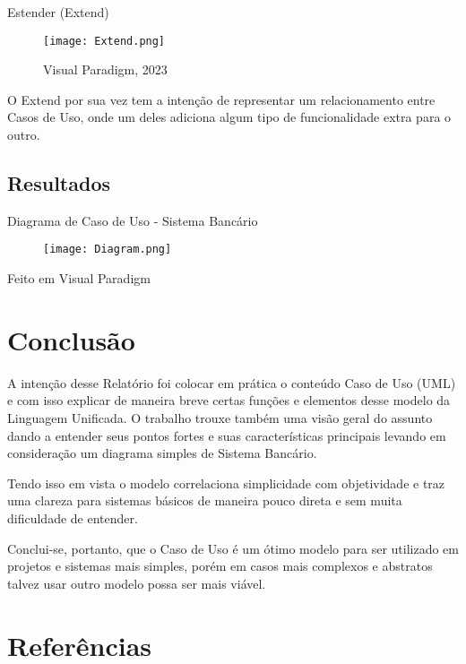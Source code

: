 \documentclass[12pt, a4paper]{article}
\begin{document}
\vspace{0.75cm}

{\Large Estender (Extend)}
\begin{figure}[h]
   \centering
   \texttt{[image: Extend.png]}
   \caption{Visual Paradigm, 2023}
\end{figure}

   O Extend por sua vez tem a intenção de representar um relacionamento
entre Casos de Uso, onde um deles adiciona algum tipo de funcionalidade
extra para o outro.

\newpage

\subsection {Resultados}

Diagrama de Caso de Uso - Sistema Bancário\\
\begin{figure}[h]
   \centering
   \texttt{[image: Diagram.png]}
\end{figure}
   
Feito em Visual Paradigm

\newpage

\section {Conclusão}

   A intenção desse Relatório foi colocar em prática o conteúdo Caso
de Uso (UML) e com isso explicar de maneira breve certas funções e
elementos desse modelo da Linguagem Unificada. O trabalho trouxe
também uma visão geral do assunto dando a entender seus pontos fortes e
suas características principais levando em consideração um diagrama
simples de Sistema Bancário.

   Tendo isso em vista o modelo correlaciona simplicidade com
objetividade e traz uma clareza para sistemas básicos de maneira pouco
direta e sem muita dificuldade de entender.

   Conclui-se, portanto, que o Caso de Uso é um ótimo modelo para ser
utilizado em projetos e sistemas mais simples, porém em casos mais
complexos e abstratos talvez usar outro modelo possa ser mais viável.

\newpage

\section {Referências}
\end{document}
